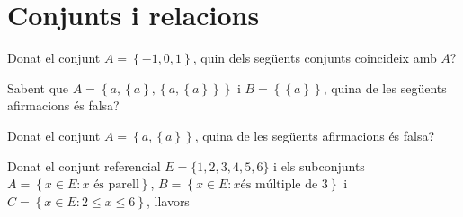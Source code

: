 
\section{Conjunts i relacions}

\begin{enumerate}
\pregunta Donat el conjunt $A=\left\{ -1,0,1\right\} $, quin dels següents
conjunts coincideix amb $A$?

\begin{enumerate}
\end{enumerate}
\feedback

\pregunta Sabent que $A=\left\{ a,\left\{ a\right\} ,\left\{ a,\left\{ a\right\}
\right\} \right\} $ i $B=\left\{ \left\{ a\right\} \right\} $, quina de les
següents afirmacions és falsa?

\begin{enumerate}
\end{enumerate}
\feedback

\pregunta Donat el conjunt $A=\left\{ a,\left\{ a\right\} \right\} $, quina de
les següents afirmacions és falsa?

\begin{enumerate}
\end{enumerate}
\feedback

\pregunta Donat el conjunt referencial $E=\{1,2,3,4,5,6\}$ i els subconjunts $%
A=\left\{ x\in E:x\text{ és parell}\right\} $, $B=\left\{ x\in E:x\text{
és múltiple de 3}\right\} $ i $C=\left\{ x\in E:2\leq x\leq6\right\}
$, llavors

\begin{enumerate}
\end{enumerate}
\feedback


\end{enumerate}
